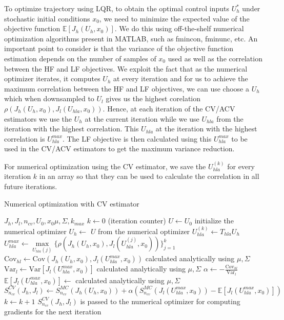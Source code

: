 \documentclass{article}
\begin{document}
To optimize trajectory using LQR, to obtain the optimal control inputs $U_h^*$ under stochastic initial conditions $x_0$,
we need to minimize the expected value of the objective function $\mathbb{E}[J_h(U_h, x_0)]$. We do this using off-the-shelf
numerical optimization algorithms present in MATLAB, such as fmincon, fminunc, etc. An important point to consider
is that the variance of the objective function estimation depends on the number of samples of $x_0$ used as well as
the correlation between the HF and LF objectives. We exploit the fact that as the numerical optimizer iterates, it computes
$U_h$ at every iteration and for us to achieve the maximum correlation between the HF and LF objectives, we can use
choose a $U_h$ which when downsampled to $U_l$ gives us the highest corelation $\rho(J_h(U_h, x_0), J_l(U_{hla}, x_0))$.
Hence, at each iteration of the CV/ACV estimators we use the $U_h$ at the current iteration while we use $U_{hla}$ from
the iteration with the highest correlation. This $U_{hla}$ at the iteration with the highest correlation is
$U_{hla}^{max}$. The LF objective is then calculated using this $U_{hla}^{max}$ to be used in the CV/ACV estimators to get the maximum variance reduction.

For numerical optimization using the CV estimator, we save the $U_{hla}^{(k)}$ for every iteration $k$ in an array
so that they can be used to calculate the correlation in all future iterations.

\begin{algorithm}
  \caption{Numerical optimization with CV estimator}
  \begin{algorithmic}
    \Require $J_h, J_l, n_{cv}, U_0, x_0 \mu, \Sigma, k_{max}$
    \State $k \gets 0$ (iteration counter)
    \State $U \gets U_0$ initialize the numerical optimizer
    \State $U_h \gets$ $U$ from the numerical optimizer
    \State $U_{hla}^{(k)} \gets T_{hla} U_h$
    \State $U_{hla}^{max} \gets \underset{U_{hla}(j)} \max \{\rho(J_h(U_h, x_0), J_l(U_{hla}^{(j)}, x_0))\}_{j=1}^k$
    \State $\text{Cov}_{hl} \gets \text{Cov}(J_h(U_h, x_0), J_l(U_{hla}^{max}, x_0))$ calculated analytically using $\mu, \Sigma$
    \State $\text{Var}_l \gets \text{Var}[J_l(U_{hla}^{max}, x_0)]$ calculated analytically using $\mu, \Sigma$
    \State $\alpha \gets -\frac{\text{Cov}_{hl}}{\text{Var}_l}$
    \State $\mathbb{E}[J_l(U_{hla}^{max}, x_0)] \gets$ calculated analytically using $\mu, \Sigma$
    \State $S_{n_{cv}}^{CV}(J_h, J_l) \gets S_{n_{cv}}^{MC}(J_h(U_h, x_0)) + \alpha (S_{n_{cv}}^{MC}(J_l(U_{hla}^{max}, x_0)) - \mathbb{E}[J_l(U_{hla}^{max}, x_0)])$
    \State $k \gets k + 1$
    \State $S_{n_{cv}}^{CV}(J_h, J_l)$ is passed to the numerical optimizer for computing gradients for the next iteration
    \EndWhile
  \end{algorithmic}
\end{algorithm}
\end{document}
